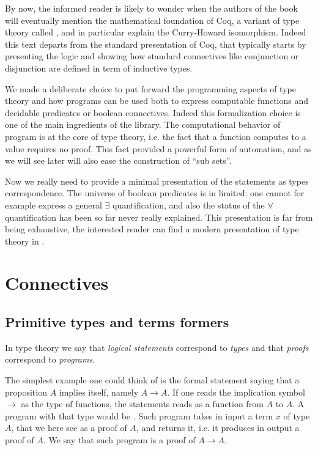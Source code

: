 \label{sec:ttch}

By now, the informed reader is likely to wonder when the authors of the book
will eventually mention the mathematical foundation of Coq, a variant of
type theory called \mcbCIC{}, and
in particular explain the Curry-Howard isomorphism.  Indeed this text departs
from the standard presentation of Coq, that typically starts by
presenting the logic and showing how standard connectives like
conjunction or disjunction are defined in term of inductive types.

We made a deliberate choice to put forward the programming aspects of
type theory and how programs can be used both to express computable functions
and decidable predicates or boolean connectives.
Indeed this formalization choice is one of the main ingredients of the \mcbMC{}
library.  The computational behavior of program is at the core of
type theory, i.e. the fact that a function computes to a value requires no
proof.  This fact provided a powerful form of automation, and as we will
see later will also ease the construction of ``sub sets''.

Now we really need to provide a minimal presentation of the statements as types
correspondence.  The universe of boolean predicates is in \mcbMC{} limited: one
cannot for example express a general $\exists$ quantification, and also the
status of the $\forall$ quantification has been so far never really explained.
This presentation is far from being exhaustive, the interested reader can find
a modern presentation of type theory in \cite{hottbook}.

\section{Connectives}

\subsection{Primitive types and terms formers}\label{sec:chi}

In type theory we say that \emph{logical statements} correspond to
\emph{types} and that \emph{proofs} correspond to \emph{programs}.

The simplest example one could think of is the formal statement saying that
a proposition $A$ implies itself, namely $A \rightarrow A$.  If one reads
the implication symbol $\to$ as the type of functions, the statements reads
as a function from $A$ to $A$.  A program with that type would be
.  Such program takes in input a term $x$ of
type $A$, that we here see as a proof of $A$, and returns it, i.e. it
produces in output a proof of $A$.  We say that such program is a
proof of $A \rightarrow A$.

